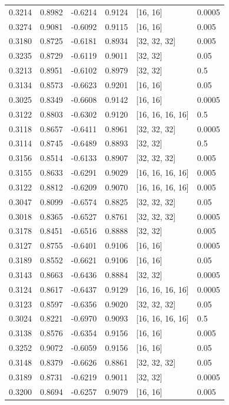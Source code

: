 \begin{tabular}{llllll}
0.3214 & 0.8982 & -0.6214 & 0.9124 & [16, 16] & 0.0005 \\
0.3274 & 0.9081 & -0.6092 & 0.9115 & [16, 16] & 0.005 \\
0.3180 & 0.8725 & -0.6181 & 0.8934 & [32, 32, 32] & 0.005 \\
0.3235 & 0.8729 & -0.6119 & 0.9011 & [32, 32] & 0.05 \\
0.3213 & 0.8951 & -0.6102 & 0.8979 & [32, 32] & 0.5 \\
0.3134 & 0.8573 & -0.6623 & 0.9201 & [16, 16] & 0.05 \\
0.3025 & 0.8349 & -0.6608 & 0.9142 & [16, 16] & 0.0005 \\
0.3122 & 0.8803 & -0.6302 & 0.9120 & [16, 16, 16, 16] & 0.5 \\
0.3118 & 0.8657 & -0.6411 & 0.8961 & [32, 32, 32] & 0.0005 \\
0.3114 & 0.8745 & -0.6489 & 0.8893 & [32, 32] & 0.5 \\
0.3156 & 0.8514 & -0.6133 & 0.8907 & [32, 32, 32] & 0.005 \\
0.3155 & 0.8633 & -0.6291 & 0.9029 & [16, 16, 16, 16] & 0.005 \\
0.3122 & 0.8812 & -0.6209 & 0.9070 & [16, 16, 16, 16] & 0.005 \\
0.3047 & 0.8099 & -0.6574 & 0.8825 & [32, 32, 32] & 0.05 \\
0.3018 & 0.8365 & -0.6527 & 0.8761 & [32, 32, 32] & 0.0005 \\
0.3178 & 0.8451 & -0.6516 & 0.8888 & [32, 32] & 0.005 \\
0.3127 & 0.8755 & -0.6401 & 0.9106 & [16, 16] & 0.0005 \\
0.3189 & 0.8552 & -0.6621 & 0.9106 & [16, 16] & 0.05 \\
0.3143 & 0.8663 & -0.6436 & 0.8884 & [32, 32] & 0.0005 \\
0.3124 & 0.8617 & -0.6437 & 0.9129 & [16, 16, 16, 16] & 0.0005 \\
0.3123 & 0.8597 & -0.6356 & 0.9020 & [32, 32, 32] & 0.05 \\
0.3024 & 0.8221 & -0.6970 & 0.9093 & [16, 16, 16, 16] & 0.5 \\
0.3138 & 0.8576 & -0.6354 & 0.9156 & [16, 16] & 0.005 \\
0.3252 & 0.9072 & -0.6059 & 0.9156 & [16, 16] & 0.05 \\
0.3148 & 0.8379 & -0.6626 & 0.8861 & [32, 32, 32] & 0.05 \\
0.3189 & 0.8731 & -0.6219 & 0.9011 & [32, 32] & 0.0005 \\
0.3200 & 0.8694 & -0.6257 & 0.9079 & [16, 16] & 0.005 \\

\end{tabular}
